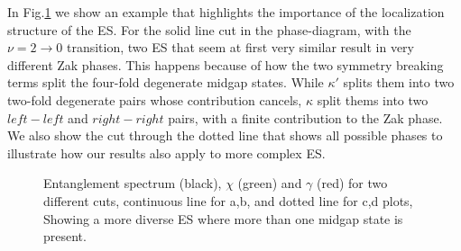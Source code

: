 \documentclass[twocolumn,amsmath,longbibliography,amssymb,superscriptaddress]{revtex4-1}
\begin{document}
In Fig.\ref{2} we show an example that highlights the importance of the localization structure of the ES. For the solid line cut in the phase-diagram, with the $\nu = 2 \rightarrow 0 $ transition, two ES that seem at first very similar result in very different Zak phases. This happens because of how the two symmetry breaking terms split the four-fold degenerate midgap states. While $\kappa'$ splits them into two two-fold degenerate pairs whose contribution cancels, $\kappa$ split thems into two $left-left$ and $right-right$ pairs, with a finite contribution to the Zak phase. We also show the cut through the dotted line that shows all possible phases to illustrate how our results also apply to more complex ES. 

\begin{figure}[h!]
\centering
{}\hspace{0mm}

\caption{Entanglement spectrum (black), $\chi$ (green) and $\gamma$ (red) for two different cuts,  continuous line for a,b, and dotted line for c,d plots, Showing a more diverse ES where more than one midgap state is present. }
\label{2}
\end{figure}
\end{document}

